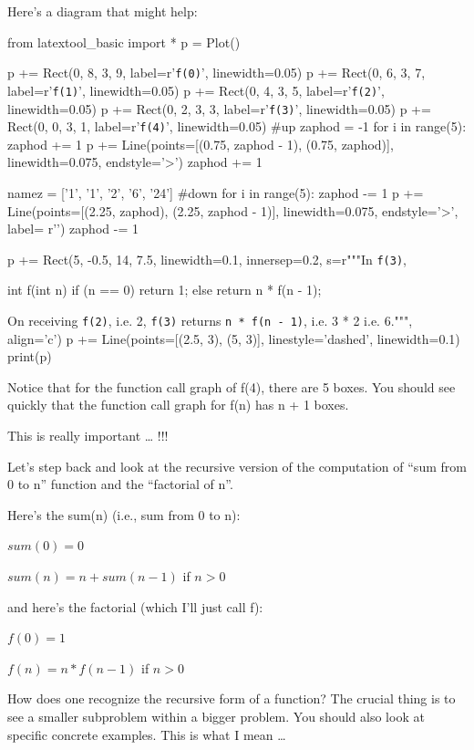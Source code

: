 Here's a diagram that might help:
\begin{python}
from latextool_basic import *
p = Plot()

p += Rect(0, 8, 3, 9, label=r'\texttt{f(0)}', linewidth=0.05)
p += Rect(0, 6, 3, 7, label=r'\texttt{f(1)}', linewidth=0.05)
p += Rect(0, 4, 3, 5, label=r'\texttt{f(2)}', linewidth=0.05)
p += Rect(0, 2, 3, 3, label=r'\texttt{f(3)}', linewidth=0.05)
p += Rect(0, 0, 3, 1, label=r'\texttt{f(4)}', linewidth=0.05)
#up
zaphod = -1
for i in range(5):
    zaphod += 1
    p += Line(points=[(0.75, zaphod - 1), (0.75, zaphod)], linewidth=0.075, endstyle='>')
    zaphod += 1

namez = ['1', '1', '2', '6', '24']
#down
for i in range(5):
    zaphod -= 1
    p += Line(points=[(2.25, zaphod), (2.25, zaphod - 1)], linewidth=0.075, endstyle='>', label= r'')
    zaphod -= 1

p += Rect(5, -0.5, 14, 7.5, linewidth=0.1, innersep=0.2, s=r"""In \texttt{f(3)}, \begin{console}
int f(int n)
{
    if (n == 0)
       return 1;
    else
       return n * f(n - 1); 
}
\end{console}
On receiving \texttt{f(2)}, i.e. 2, \texttt{f(3)} returns \texttt{n * f(n - 1)}, i.e. 3 * 2 i.e. 6.""", align='c')
p += Line(points=[(2.5, 3), (5, 3)], linestyle='dashed', linewidth=0.1)
print(p)
\end{python}


Notice that for the function call graph of f(4), there are 5 boxes. You
should see quickly that the function call graph for f(n) has n + 1
boxes.


\newpage{}

This is really important \ldots{} !!!

Let's step back and look at the recursive version of the
computation of ``sum from 0 to n'' function and the ``factorial of n''.

Here's the sum(n) (i.e., sum from 0 to n):

$sum(0) = 0$

$sum(n) = n + sum(n - 1)$ if $n > 0$

and here's the factorial (which I'll
just call f):

$f(0) = 1$

$f(n) = n * f(n - 1)$ if $n > 0$

How does one recognize the recursive form of a function? The crucial
thing is to see a smaller subproblem within a bigger problem. You should
also look at specific concrete examples. This is what I mean \ldots{}

